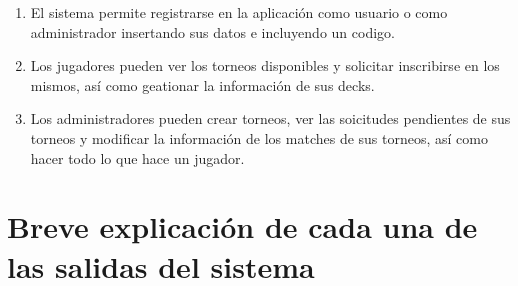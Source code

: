 \documentclass[a4paper]{article}
\begin{document}
\begin{enumerate}
\item El sistema permite registrarse en la aplicaci\'on como usuario o como administrador insertando sus datos e incluyendo un codigo.
\item Los jugadores pueden ver los torneos disponibles y solicitar inscribirse en los mismos, as\'i como geationar la informaci\'on de sus decks.
\item Los administradores pueden crear torneos, ver las soicitudes pendientes de sus torneos y modificar la informaci\'on de los matches de sus torneos, as\'i como hacer todo lo que hace un jugador.
\end{enumerate}

\newpage

\section{Breve explicaci\'on de cada una de las salidas del sistema}
\end{document}
